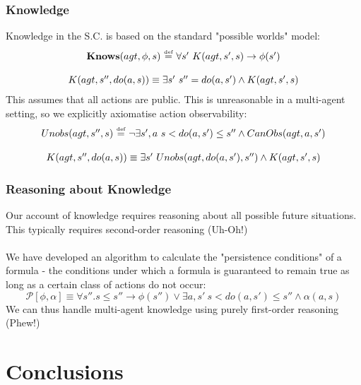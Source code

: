 \documentclass{beamer}
\newcommand{\isdef}{\hbox{$\stackrel{\mbox{\tiny def}}{=}$}}
\begin{document}
\begin{frame}
\frametitle{Knowledge}
Knowledge in the S.C. is based on the standard "possible worlds" model:
\[
\begin{array}{c}
\mathbf{Knows}(agt,\phi,s)\ \isdef\ \forall s'\ K(agt,s',s) \rightarrow \phi(s')\\
\\
K(agt,s'',do(a,s)) \equiv \exists s'\ s''=do(a,s') \wedge K(agt,s',s)
\end{array}
\]
\pause
This assumes that all actions are public.  This is unreasonable
in a multi-agent setting, so we explicitly axiomatise action observability:
\[
\begin{array}{c}
Unobs(agt,s'',s)\ \isdef\ \neg\exists s',a\ s<do(a,s')\leq s'' \wedge CanObs(agt,a,s')\\
\\
K(agt,s'',do(a,s)) \equiv \exists s'\ Unobs(agt,do(a,s'),s'') \wedge K(agt,s',s)
\end{array}
\]

\end{frame}

\begin{frame}
\frametitle{Reasoning about Knowledge}
Our account of knowledge requires reasoning about all possible future
situations.  This typically requires second-order reasoning (Uh-Oh!)
\pause
\ \\
\ \\
We have developed an algorithm to calculate the "persistence conditions"
of a formula - the conditions under which a formula is guaranteed to
remain true as long as a certain class of actions do not occur:
\[
\mathcal{P}[\phi,\alpha] \equiv \forall s'' . s \leq s'' \rightarrow \phi(s'') \vee \exists a,s'\ s<do(a,s')\leq s'' \wedge \alpha(a,s)
\]
\pause
We can thus handle multi-agent knowledge using purely first-order reasoning
(Phew!)
\end{frame}

\section{Conclusions}
\end{document}
